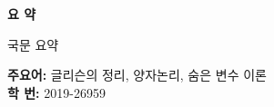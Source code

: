 \newpage

\thispagestyle{plain}
\begin{center}
    \Large
    \textbf{요 약}
\end{center}

국문 요약
\cite{MR2015280}

\textbf{주요어:} 글리슨의 정리, 양자논리, 숨은 변수 이론\\
\textbf{학 번:} 2019-26959
